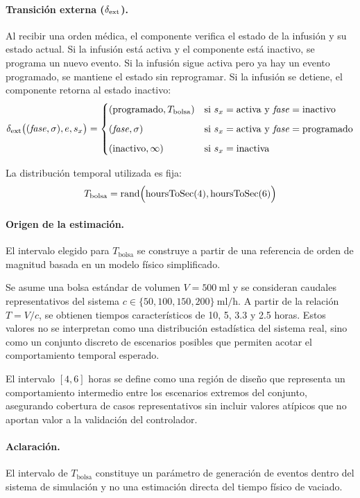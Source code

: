 \paragraph{Transición externa ($\delta_{\mathrm{ext}}$).}
Al recibir una orden médica, el componente verifica el estado de la infusión y su estado actual. Si la infusión está activa y el componente está inactivo, se programa un nuevo evento. Si la infusión sigue activa pero ya hay un evento programado, se mantiene el estado sin reprogramar. Si la infusión se detiene, el componente retorna al estado inactivo:
\[
\delta_{\mathrm{ext}} \bigl( (\mathit{fase}, \sigma), e, s_x \bigr) =
\begin{cases}
(\text{programado}, T_{\mathrm{bolsa}}) & \text{si } s_x = \text{activa} \text{ y } \mathit{fase} = \text{inactivo} \\[6pt]
(\mathit{fase}, \sigma) & \text{si } s_x = \text{activa} \text{ y } \mathit{fase} = \text{programado} \\[6pt]
(\text{inactivo}, \infty) & \text{si } s_x = \text{inactiva}
\end{cases}
\]

La distribución temporal utilizada es fija:
\[
T_{\mathrm{bolsa}}
=
\text{rand}
\Bigl(
\operatorname{hoursToSec}(4),
\operatorname{hoursToSec}(6)
\Bigr)
\]

\paragraph{Origen de la estimación.}
El intervalo elegido para $T_{\mathrm{bolsa}}$ se construye a partir de una referencia de orden de magnitud basada en un modelo físico simplificado.

Se asume una bolsa estándar de volumen $V = 500\ \mathrm{ml}$ y se consideran caudales representativos del sistema $c \in \{50, 100, 150, 200\}\ \mathrm{ml/h}$. A partir de la relación $T = V/c$, se obtienen tiempos característicos de 10, 5, 3.3 y 2.5 horas. Estos valores no se interpretan como una distribución estadística del sistema real, sino como un conjunto discreto de escenarios posibles que permiten acotar el comportamiento temporal esperado.

El intervalo $[4,6]$ horas se define como una región de diseño que representa un comportamiento intermedio entre los escenarios extremos del conjunto, asegurando cobertura de casos representativos sin incluir valores atípicos que no aportan valor a la validación del controlador.

\paragraph{Aclaración.}
El intervalo de $T_{\mathrm{bolsa}}$ constituye un parámetro de generación de eventos dentro del sistema de simulación y no una estimación directa del tiempo físico de vaciado.

